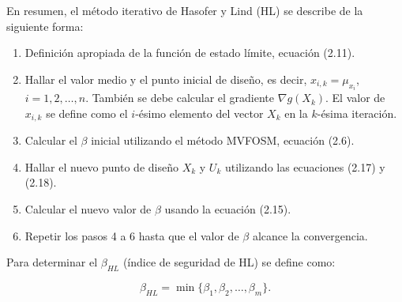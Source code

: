 En resumen, el método iterativo de Hasofer y Lind (HL) se describe de la siguiente forma:

\begin{enumerate}
    \item Definición apropiada de la función de estado límite, ecuación (2.11).
    \item Hallar el valor medio y el punto inicial de diseño, es decir, \(x_{i,k} = \mu_{x_i}\), \(i = 1, 2, \dots, n\). También se debe calcular el gradiente \(\nabla g(X_k)\). El valor de \(x_{i,k}\) se define como el \(i\)-ésimo elemento del vector \(X_k\) en la \(k\)-ésima iteración.
    \item Calcular el \(\beta\) inicial utilizando el método MVFOSM, ecuación (2.6).
    \item Hallar el nuevo punto de diseño \(X_k\) y \(U_k\) utilizando las ecuaciones (2.17) y (2.18).
    \item Calcular el nuevo valor de \(\beta\) usando la ecuación (2.15).
    \item Repetir los pasos 4 a 6 hasta que el valor de \(\beta\) alcance la convergencia.
\end{enumerate}

Para determinar el \(\beta_{HL}\) (índice de seguridad de HL) se define como:

\begin{equation}
\beta_{HL} = \min \{\beta_1, \beta_2, \dots, \beta_m\}.
\end{equation}
